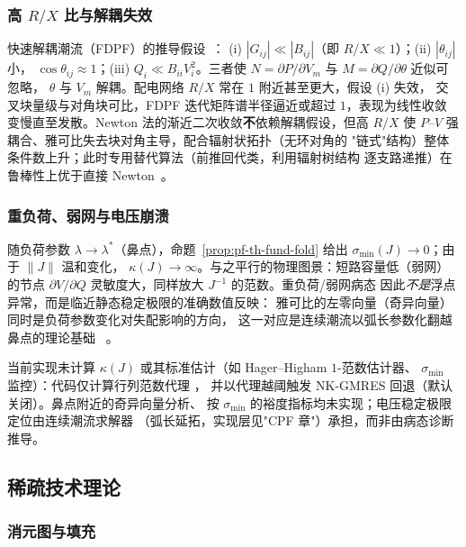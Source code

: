 \subsubsection{高 \texorpdfstring{$R/X$}{R/X} 比与解耦失效}

快速解耦潮流（FDPF）的推导假设~\cite{pff:stott-alsac}：
(i) $|G_{ij}|\ll|B_{ij}|$（即 $R/X\ll1$）；(ii) $|\theta_{ij}|$ 小，
$\cos\theta_{ij}\approx1$；(iii) $Q_i\ll B_{ii}V_i^2$。三者使
$N=\partial P/\partial V_m$ 与 $M=\partial Q/\partial\theta$ 近似可忽略，
$\theta$ 与 $V_m$ 解耦。配电网络 $R/X$ 常在 $1$ 附近甚至更大，假设 (i) 失效，
交叉块量级与对角块可比，FDPF 迭代矩阵谱半径逼近或超过 $1$，表现为线性收敛
变慢直至发散。Newton 法的渐近二次收敛\textbf{不}依赖解耦假设，但高 $R/X$
使 $P$--$V$ 强耦合、雅可比失去块对角主导，配合辐射状拓扑（无环对角的
"链式"结构）整体条件数上升；此时专用替代算法（前推回代类，利用辐射树结构
逐支路递推）在鲁棒性上优于直接 Newton~\cite{pff:stott-review}。

\subsubsection{重负荷、弱网与电压崩溃}

随负荷参数 $\lambda\to\lambda^*$（鼻点），命题~\ref{prop:pf-th-fund-fold}
给出 $\sigma_{\min}(J)\to0$；由于 $\lVert J\rVert$ 温和变化，
$\kappa(J)\to\infty$。与之平行的物理图景：短路容量低（弱网）的节点
$\partial V/\partial Q$ 灵敏度大，同样放大 $J^{-1}$ 的范数。重负荷/弱网病态
因此\emph{不是}浮点异常，而是临近静态稳定极限的准确数值反映：
雅可比的左零向量（奇异向量）同时是负荷参数变化对失配影响的方向，
这一对应是连续潮流以弧长参数化翻越鼻点的理论基础
~\cite{pff:ajjarapu-christy,pff:vancutsem-vournas,pff:kundur}。

\begin{gapnote}
当前实现未计算 $\kappa(J)$ 或其标准估计（如 Hager--Higham $1$-范数估计器、
$\sigma_{\min}$ 监控）：代码仅计算行列范数代理
，
并以代理越阈触发 NK-GMRES 回退（默认关闭）。鼻点附近的奇异向量分析、
按 $\sigma_{\min}$ 的裕度指标均未实现；电压稳定极限定位由连续潮流求解器
（弧长延拓，实现层见"CPF 章"）承担，而非由病态诊断推导。
\end{gapnote}

\subsection{稀疏技术理论}\label{sec:pf-th-fund-sparsity}

\subsubsection{消元图与填充}

